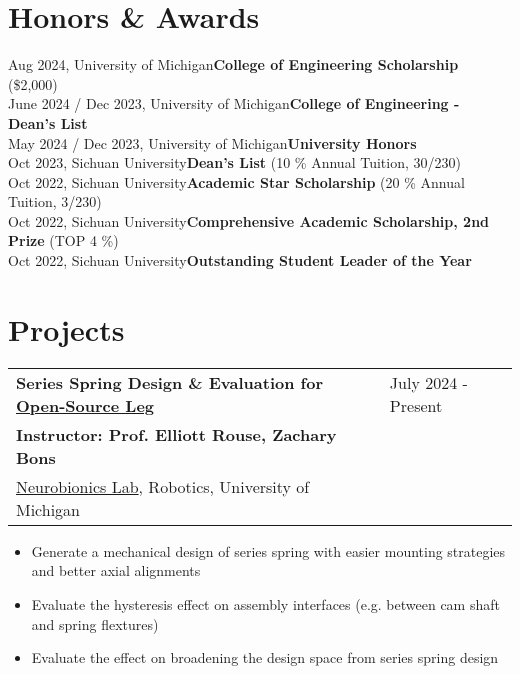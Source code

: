 \documentclass[letter,12pt]{article}
\begin{document}
\section{Honors \& Awards}

\small
{
    Aug 2024, University of Michigan\hfill \textbf{College of Engineering Scholarship} (\$2,000)\\
    June 2024 / Dec 2023, University of Michigan\hfill \textbf{College of Engineering - Dean's List}\\
    May 2024 / Dec 2023, University of Michigan\hfill \textbf{University Honors}\\
    Oct 2023, Sichuan University\hfill \textbf{Dean's List} (10 \% Annual Tuition, 30/230)\\
    Oct 2022, Sichuan University\hfill \textbf{Academic Star Scholarship} (20 \% Annual Tuition, 3/230)\\
    Oct 2022, Sichuan University\hfill \textbf{Comprehensive Academic Scholarship, 2nd Prize} (TOP 4 \%)\\
    Oct 2022, Sichuan University\hfill \textbf{Outstanding Student Leader of the Year}\\
}



\section{Projects}

\begin{tabularx}{\linewidth}{@{}l X@{}}
    \large \textbf{Series Spring Design \& Evaluation for \href{https://www.opensourceleg.org/about}{Open-Source Leg}} & \hfill July 2024 - Present \\
    \small{\textbf{Instructor: Prof. Elliott Rouse, Zachary Bons}} & \hfill {} \\
    \small{\href{https://neurobionics.robotics.umich.edu/}{Neurobionics Lab}, Robotics, University of Michigan} & \hfill {} \\
    \end{tabularx}
    

    \begin{itemize}[
        rightmargin=2cm
    ]
        \setlength{\itemsep}{1pt}
        \setlength{\parskip}{0pt}
        \setlength{\parsep}{0pt}
        \item {Generate a mechanical design of series spring with easier mounting strategies and better axial alignments}
        \item {Evaluate the hysteresis effect on assembly interfaces (e.g. between cam shaft and spring flextures)}
        \item {Evaluate the effect on broadening the design space from series spring design}
    \end{itemize}
\end{document}
